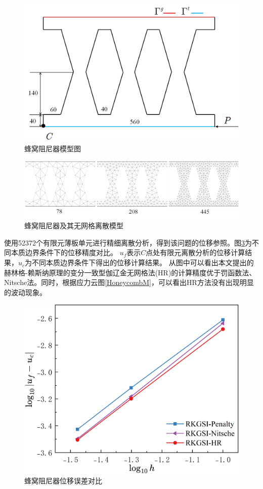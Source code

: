 \begin{figure}[H]
    \centering
    \includegraphics[scale=0.5]{figure/DAMPER/Honeycomb/2.png}
    \caption{蜂窝阻尼器模型图}\label{Honeycomb2}
\end{figure}
\begin{figure}[H]
    \centering
    \includegraphics[scale=0.65]{figure/DAMPER/Honeycomb/honeycomb_damper_msh.png}
    \caption{蜂窝阻尼器及其无网格离散模型}\label{Honeycombmsh}
\end{figure}
使用52372个有限元薄板单元进行精细离散分析，得到该问题的位移参照。图\ref{honeycomb_damperx}为不同本质边界条件下的位移精度对比。
$u_f$表示$C$点处有限元离散分析的位移计算结果，$u_c$为不同本质边界条件下得出的位移计算结果。
从图中可以看出本文提出的赫林格-赖斯纳原理的变分一致型伽辽金无网格法(HR)的计算精度优于罚函数法、Nitsche法。同时，根据应力云图\ref{HoneycombM}，可以看出HR方法没有出现明显的波动现象。
\newpage
\begin{figure}[H]
    \centering
    \includegraphics[scale=0.5]{figure/DAMPER/Honeycomb/honeycomb_damper_x.png}
    \caption{蜂窝阻尼器位移误差对比}\label{honeycomb_damperx}
\end{figure}
